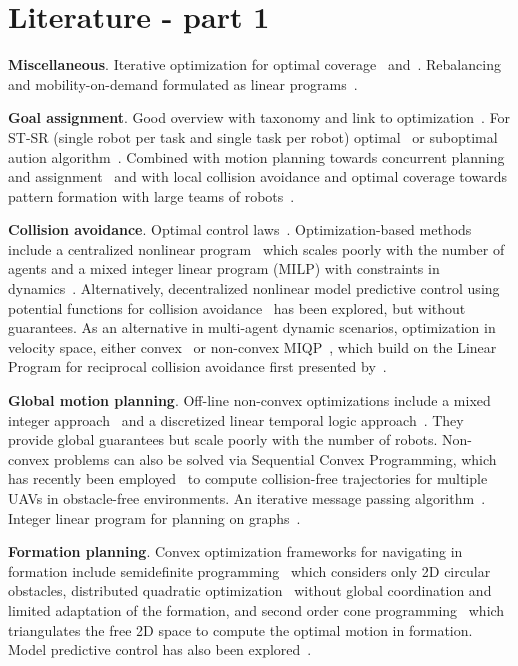 
\section{Literature - part 1}\label{sec:3}

\textbf{Miscellaneous}. 
Iterative optimization for optimal coverage~\cite{cortes04} and~\cite{Schwager:2009fz}. Rebalancing and mobility-on-demand formulated as linear programs~\cite{Smith:2013fa}.

\textbf{Goal assignment}.
Good overview with taxonomy and link to optimization~\cite{Gerkey:2004il}. For ST-SR (single robot per task and single task per robot) optimal~\cite{kuhn55} or suboptimal aution algorithm~\cite{Bertsekas:1992wx}.
Combined with motion planning towards concurrent planning and assignment~\cite{Turpin:2014bu} and with local collision avoidance and optimal coverage towards pattern formation with large teams of robots~\cite{alonsomora12ijrr}.

\textbf{Collision avoidance}.
Optimal control laws~\cite{Hoffmann:2008vl}. Optimization-based methods include a centralized nonlinear program~\cite{Raghunathan:2004ga} which scales poorly with the number of agents and a mixed integer linear program (MILP) with constraints in dynamics~\cite{Kuwata:2007vq}.
 Alternatively, decentralized nonlinear model predictive control using potential functions for collision avoidance~\cite{Shim:2003ih} has been explored, but without guarantees.
As an alternative in multi-agent dynamic scenarios, optimization in velocity space, either convex~\cite{snape09, AlonsoMora:2014kb, alonsomora2015auro} or non-convex MIQP~\cite{alonsomora13icra}, which build on the Linear Program for reciprocal collision avoidance first presented by~\cite{vandenberg09}.

\textbf{Global motion planning}.
Off-line non-convex optimizations include a mixed integer approach~\cite{Mellinger:2012fi, Kushleyev:2012wy} and a discretized linear temporal logic approach~\cite{Saha:2014vi}. They provide global guarantees but scale poorly with the number of robots. 
Non-convex problems can also be solved via Sequential Convex Programming, which has recently been employed~\cite{augugliaro12} to compute collision-free trajectories for multiple UAVs in obstacle-free environments. An iterative message passing algorithm~\cite{Bento:2013td}. Integer linear program for planning on graphs~\cite{Yu:2013ij}.

\textbf{Formation planning}.
Convex optimization frameworks for navigating in formation include semidefinite programming~\cite{Derenick:2010cc} which considers only 2D circular obstacles, distributed quadratic optimization~\cite{AlonsoMora:2015wi} without global coordination and limited adaptation of the formation,
and second order cone programming~\cite{Derenick:ha} which triangulates the free 2D space to compute the optimal motion in formation. Model predictive control has also been explored~\cite{Dunbar:2002fh}.


